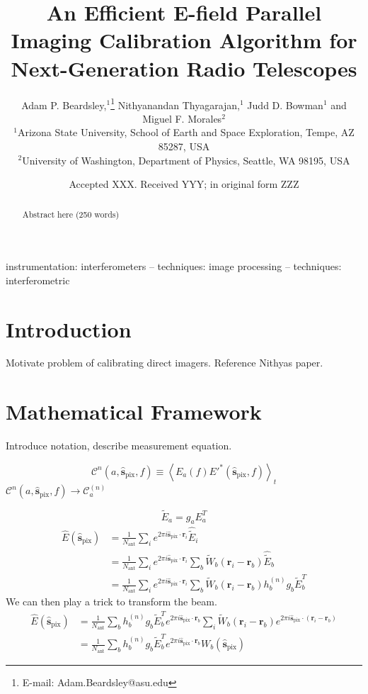 \documentclass[a4paper,fleqn,usenatbib]{../mnras}
\title[E-field Parallel Imaging Calibration]{An Efficient E-field Parallel Imaging Calibration Algorithm for Next-Generation Radio Telescopes}
\author[Beardsley et al.]{
Adam P. Beardsley,$^{1}$\thanks{E-mail: Adam.Beardsley@asu.edu}
Nithyanandan Thyagarajan,$^{1}$
Judd D. Bowman$^{1}$
\newauthor
and Miguel F. Morales$^{2}$
\\
$^{1}$Arizona State University, School of Earth and Space Exploration, Tempe, AZ 85287, USA\\
$^{2}$University of Washington, Department of Physics, Seattle, WA 98195, USA\\
}
\date{Accepted XXX. Received YYY; in original form ZZZ}
\newcommand{\spix}{\hat{\mathbf{s}}_{\mathrm{pix}}}
\newcommand{\Cna}{\mathcal{C}^{(n)}_a}
\newcommand{\ri}{\mathbf{r}_i}
\newcommand{\rb}{\mathbf{r}_b}
\newcommand{\Nant}{N_{\mathrm{ant}}}
\newcommand{\beamr}{\widetilde{W}}
\newcommand{\beamtheta}{W}
\newcommand{\Er}[1]{\widetilde{E}_{#1}}
\newcommand{\Erest}[1]{\hat{\widetilde{E}}_{#1}}
\begin{document}
\label{firstpage}
\pagerange{\pageref{firstpage}--\pageref{lastpage}}
\maketitle

\begin{abstract}
Abstract here (250 words)
\end{abstract}

\begin{keywords}
instrumentation: interferometers -- techniques: image processing -- techniques: interferometric
\end{keywords}



\section{Introduction}

Motivate problem of calibrating direct imagers. Reference Nithyas paper. \citep{mor11}

\section{Mathematical Framework}

Introduce notation, describe measurement equation.


\begin{equation}
\mathcal{C}^n(a,\spix,f) \equiv \left<E_a(f) E'^*(\spix,f)\right>_t
\end{equation}
$\mathcal{C}^n(a,\spix,f) \rightarrow \Cna$

\begin{equation}
\Er{a} = g_a E^T_a
\end{equation}
\begin{align}
\hat{E}(\spix) & = \frac{1}{\Nant} \sum_i e^{2\pi i \spix \cdot \ri} \Erest{i} \\
& = \frac{1}{\Nant} \sum_i e^{2\pi i \spix \cdot \ri} \sum_b \beamr_b(\ri-\rb) \Erest{b} \\
& = \frac{1}{\Nant} \sum_i e^{2\pi i \spix \cdot \ri} \sum_b \beamr_b(\ri-\rb) h^{(n)}_b g_b\Er{b}^T
\end{align}
We can then play a trick to transform the beam.
\begin{align}
\hat{E}(\spix) & = \frac{1}{\Nant} \sum_b h^{(n)}_b g_b\Er{b}^T e^{2\pi i \spix \cdot \rb}\sum_i \beamr_b(\ri-\rb)e^{2\pi i \spix \cdot (\ri-\rb)}\\
& = \frac{1}{\Nant} \sum_b h^{(n)}_b g_b\Er{b}^T e^{2\pi i \spix \cdot \rb}\beamtheta_b(\spix)
\end{align}
\end{document}
